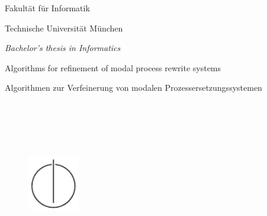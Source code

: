 \let\cleardoublepage\clearpage

\thispagestyle{empty}
\begin{titlepage}
  \begin{center}
    \begin{figure}[htp]
      \centering
      \oTUM{6cm}
    \end{figure}

    \vspace*{2\baselineskip}
    
    {\large{\scfont Fakultät für Informatik}}
    
    {\large {\scfont Technische Universität München}}
    
    \vspace{1.5cm}
    
    {\large \em Bachelor's thesis in Informatics}

    { \huge Algorithms for refinement of modal process rewrite systems}
    
    { \huge Algorithmen zur Verfeinerung von modalen Prozessersetzungssystemen}

    \vspace{1.0cm}
    \large{
                  \\
              \\
                 \\
         \makebox[7cm][l]{\ \ \ \today}\\
    }
    
    \vspace{1.0cm}
    
    \begin{figure}[htp]
      \centering
      \includegraphics[width=0.20\textwidth]{IN_schwarz_CMYK.pdf}
    \end{figure}
  
  \end{center}
\end{titlepage}

